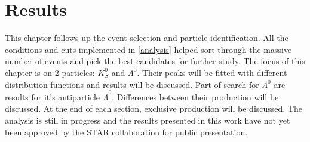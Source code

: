 \chapter{Results}
\label{resultS}
This chapter follows up the event selection and particle identification. All the conditions and cuts implemented in \autoref{analysis} helped sort through the massive number of events and pick the best candidates for further study. The focus of this chapter is on 2 particles: $K^0_S$ and $\Lambda^0$. Their peaks will be fitted with different distribution functions and results will be discussed. Part of search for $\Lambda^0$ are results for it's antiparticle $\overline{\Lambda}^0$. Differences between their production will be discussed. At the end of each section, exclusive production will be discussed. The analysis is still in progress and the results presented in this work have not yet been approved by the STAR collaboration for public presentation.
